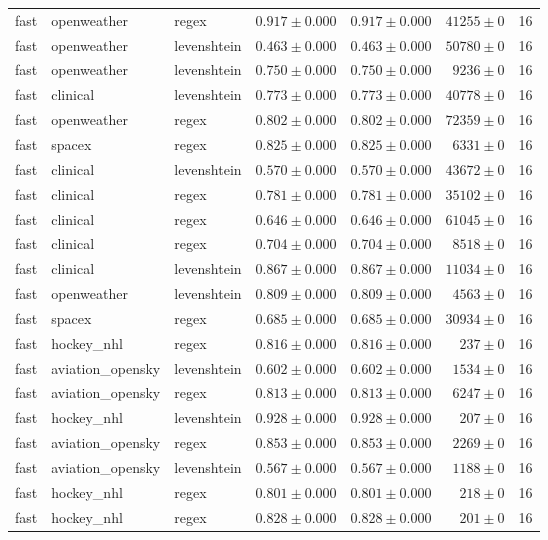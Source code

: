 \begin{table}[htbp]
\begin{tabular}{l l l r r r r}
fast & openweather & regex & $0.917\pm0.000$ & $0.917\pm0.000$ & $41255\pm0$ & 16 \\
fast & openweather & levenshtein & $0.463\pm0.000$ & $0.463\pm0.000$ & $50780\pm0$ & 16 \\
fast & openweather & levenshtein & $0.750\pm0.000$ & $0.750\pm0.000$ & $9236\pm0$ & 16 \\
fast & clinical & levenshtein & $0.773\pm0.000$ & $0.773\pm0.000$ & $40778\pm0$ & 16 \\
fast & openweather & regex & $0.802\pm0.000$ & $0.802\pm0.000$ & $72359\pm0$ & 16 \\
fast & spacex & regex & $0.825\pm0.000$ & $0.825\pm0.000$ & $6331\pm0$ & 16 \\
fast & clinical & levenshtein & $0.570\pm0.000$ & $0.570\pm0.000$ & $43672\pm0$ & 16 \\
fast & clinical & regex & $0.781\pm0.000$ & $0.781\pm0.000$ & $35102\pm0$ & 16 \\
fast & clinical & regex & $0.646\pm0.000$ & $0.646\pm0.000$ & $61045\pm0$ & 16 \\
fast & clinical & regex & $0.704\pm0.000$ & $0.704\pm0.000$ & $8518\pm0$ & 16 \\
fast & clinical & levenshtein & $0.867\pm0.000$ & $0.867\pm0.000$ & $11034\pm0$ & 16 \\
fast & openweather & levenshtein & $0.809\pm0.000$ & $0.809\pm0.000$ & $4563\pm0$ & 16 \\
fast & spacex & regex & $0.685\pm0.000$ & $0.685\pm0.000$ & $30934\pm0$ & 16 \\
fast & hockey\_nhl & regex & $0.816\pm0.000$ & $0.816\pm0.000$ & $237\pm0$ & 16 \\
fast & aviation\_opensky & levenshtein & $0.602\pm0.000$ & $0.602\pm0.000$ & $1534\pm0$ & 16 \\
fast & aviation\_opensky & regex & $0.813\pm0.000$ & $0.813\pm0.000$ & $6247\pm0$ & 16 \\
fast & hockey\_nhl & levenshtein & $0.928\pm0.000$ & $0.928\pm0.000$ & $207\pm0$ & 16 \\
fast & aviation\_opensky & regex & $0.853\pm0.000$ & $0.853\pm0.000$ & $2269\pm0$ & 16 \\
fast & aviation\_opensky & levenshtein & $0.567\pm0.000$ & $0.567\pm0.000$ & $1188\pm0$ & 16 \\
fast & hockey\_nhl & regex & $0.801\pm0.000$ & $0.801\pm0.000$ & $218\pm0$ & 16 \\
fast & hockey\_nhl & regex & $0.828\pm0.000$ & $0.828\pm0.000$ & $201\pm0$ & 16 \\

\end{tabular}
\end{table}
